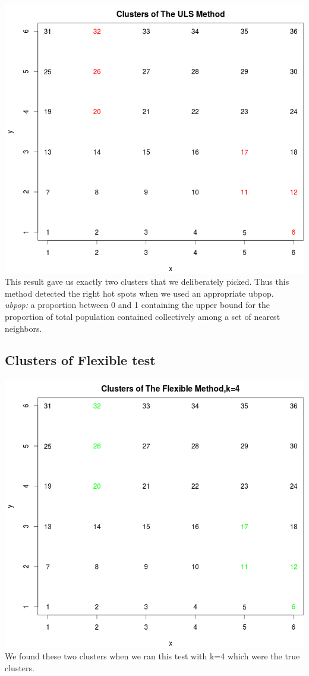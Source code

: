 \documentclass[12pt]{article}
\begin{document}
	 \includegraphics[scale=0.25]{test_2}\\ This result gave us exactly two clusters that we deliberately picked. Thus this method detected the right hot spots when we used an appropriate ubpop.  \\ 
	\textit{ubpop:} a proportion between 0 and 1 containing the upper bound for the proportion of total population contained collectively among a set of nearest neighbors.\\
	\subsection{Clusters of Flexible test} 
	 \includegraphics[scale=0.4]{test_3} \\ We found these two clusters when we ran this test with k=4 which were the true clusters.\\ 
\end{document}

